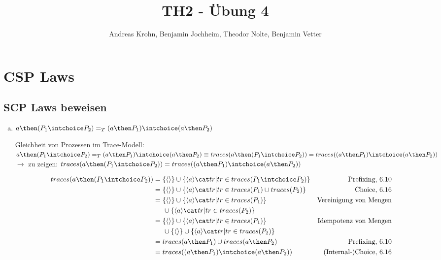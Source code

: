 \documentclass{scrreprt}
\begin{document}
\author{Andreas Krohn, Benjamin Jochheim, Theodor Nolte, Benjamin Vetter}
\title{TH2 - Übung 4}

\maketitle

\chapter{CSP Laws}

\section{SCP Laws beweisen}

\begin{enumerate}[a)]

\item{
  $ a \then (P_1 \intchoice P_2) =_T (a \then P_1) \intchoice (a \then P_2) $

  Gleichheit von Prozessen im Trace-Modell:\\
  $a \then (P_1 \intchoice P_2) =_T (a \then P_1) \intchoice (a \then P_2) \\
  \equiv traces(a \then (P_1 \intchoice P_2)) = traces((a \then P_1) \intchoice (a \then P_2))$ \\

  $\rightarrow$ zu zeigen: $traces(a \then (P_1 \intchoice P_2)) = traces((a \then P_1) \intchoice (a \then P_2))$

  \begin{align*}
    traces(a \then (P_1 \intchoice P_2)) &= \{ \langle \rangle \} \cup \{ \langle a \rangle \cat tr | tr \in traces(P_1 \intchoice P_2)\} & \text{Prefixing, 6.10}\\
                                         &= \{ \langle \rangle \} \cup \{ \langle a \rangle \cat tr | tr \in traces(P_1) \cup traces(P_2)\} & \text{Choice, 6.16}\\
                                         &= \{ \langle \rangle \} \cup \{ \langle a \rangle \cat tr | tr \in traces(P_1)\} &\text{Vereinigung von Mengen}\\
                                         &\hspace{0.5cm}\cup \{ \langle a \rangle \cat tr | tr \in traces(P_2)\}\\
                                         &= \{ \langle \rangle \} \cup \{ \langle a \rangle \cat tr | tr \in traces(P_1)\} &\text{Idempotenz von Mengen}\\
                                         &\hspace{0.5cm}\cup \{ \langle \rangle \} \cup \{ \langle a \rangle \cat tr | tr \in traces(P_2)\}\\
                                         &= traces(a \then P_1) \cup traces(a \then P_2) &\text{Prefixing, 6.10}\\
                                         &= traces((a \then P_1) \intchoice (a \then P_2)) &\text{(Internal-)Choice, 6.16}\\
  \end{align*}
  \flushright{\qedsymbol}\\
}


\end{enumerate}
\end{document}

